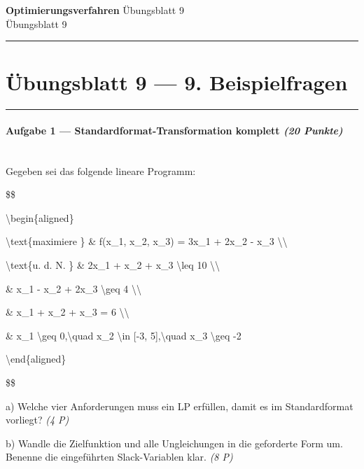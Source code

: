 \documentclass[11pt, a4paper]{article}
\providecommand{\nichttitle}{Übungsblatt}
\providecommand{\nichtsubtitle}{}
\renewcommand{\nichttitle}{Optimierungsverfahren}
\renewcommand{\nichtsubtitle}{Übungsblatt 9}
\begin{document}
\begin{center}
{\Large\bfseries\color{accent}\nichttitle}
\ifx\nichtsubtitle\empty\else
  \\[2pt]{\normalsize\color{accent!80!black}\nichtsubtitle}
\fi
\\[2pt]
\color{accent}\rule{0.4\linewidth}{0.8pt}\color{black}
\end{center}
\vspace{4pt}


\section{Übungsblatt 9 — 9. Beispielfragen}


\noindent\textcolor{rulegray}{\rule{\linewidth}{0.4pt}}


\paragraph{Aufgabe 1 — Standardformat-Transformation komplett \textit{(20 Punkte)}}\mbox{}\\[2pt]

Gegeben sei das folgende lineare Programm:


\$\$

\textbackslash{}begin\{aligned\}

\textbackslash{}text\{maximiere \} \& f(x\_1, x\_2, x\_3) = 3x\_1 + 2x\_2 - x\_3 \textbackslash{}\textbackslash{}

\textbackslash{}text\{u. d. N. \} \& 2x\_1 + x\_2 + x\_3 \textbackslash{}leq 10 \textbackslash{}\textbackslash{}

\& x\_1 - x\_2 + 2x\_3 \textbackslash{}geq 4 \textbackslash{}\textbackslash{}

\& x\_1 + x\_2 + x\_3 = 6 \textbackslash{}\textbackslash{}

\& x\_1 \textbackslash{}geq 0,\textbackslash{}quad x\_2 \textbackslash{}in [-3, 5],\textbackslash{}quad x\_3 \textbackslash{}geq -2

\textbackslash{}end\{aligned\}

\$\$


a) Welche vier Anforderungen muss ein LP erfüllen, damit es im Standardformat vorliegt? \textit{(4 P)}

b) Wandle die Zielfunktion und alle Ungleichungen in die geforderte Form um. Benenne die eingeführten Slack-Variablen klar. \textit{(8 P)}
\end{document}

